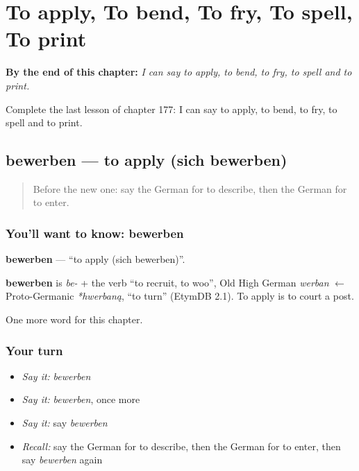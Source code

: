 
\chapter{To apply, To bend, To fry, To spell, To print}
\label{ch:ge-to-apply-to-bend-to-fry-to-spell-to-print}

\begin{chapteropening}
\textbf{By the end of this chapter:} \emph{I can say to apply, to bend, to fry, to spell and to print.}

Complete the last lesson of chapter 177: I can say to apply, to bend, to fry, to spell and to print.
\end{chapteropening}

\section[bewerben]{bewerben — to apply (sich bewerben)}

\label{lesson:GE-C177-bewerben}



\begin{quote}
Before the new one: say the German for to describe, then the German for to enter.
\end{quote}

\subsection*{You'll want to know: bewerben}
\textbf{bewerben} — \textquotedblleft{}to apply (sich bewerben)\textquotedblright{}.

\begin{cousinweb}
\textbf{bewerben} is \emph{be-} + the verb \textquotedblleft{}to recruit, to woo\textquotedblright{}, Old High German \emph{werban} $\leftarrow$ Proto-Germanic \emph{*hwerbaną}, \textquotedblleft{}to turn\textquotedblright{} (EtymDB 2.1). To apply is to court a post.
\end{cousinweb}

\begin{grammarlens}[title={What you've built}]
One more word for this chapter.
\end{grammarlens}

\subsection*{Your turn}
\begin{itemize}
\raggedright
  \item \emph{Say it:} \emph{bewerben}
  \item \emph{Say it:} \emph{bewerben}, once more
  \item \emph{Say it:} say \emph{bewerben}
  \item \emph{Recall:} say the German for to describe, then the German for to enter, then say \emph{bewerben} again
\end{itemize}

